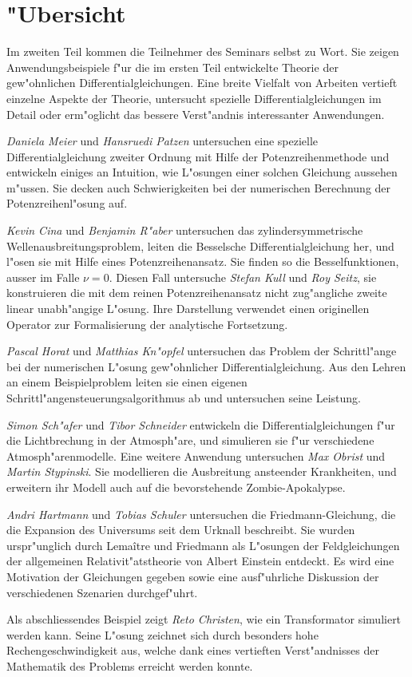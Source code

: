 %
%
%
\chapter*{"Ubersicht}
\rhead{}
\label{skript:uebersicht}
Im zweiten Teil kommen die Teilnehmer des Seminars selbst zu Wort.
Sie zeigen Anwendungsbeispiele f"ur die im ersten
Teil entwickelte Theorie der gew"ohnlichen Differentialgleichungen.
Eine breite Vielfalt von Arbeiten vertieft einzelne Aspekte der Theorie,
untersucht spezielle Differentialgleichungen im Detail
oder erm"oglicht das bessere Verst"andnis interessanter Anwendungen.

{\em Daniela Meier} und {\em Hansruedi Patzen} untersuchen eine spezielle
Differentialgleichung zweiter Ordnung mit Hilfe der Potenzreihenmethode
und entwickeln einiges an Intuition, wie L"osungen einer solchen Gleichung
aussehen m"ussen.
Sie decken auch Schwierigkeiten bei der numerischen Berechnung der
Potenzreihenl"osung auf.

{\em Kevin Cina} und {\em Benjamin R"aber} untersuchen das zylindersymmetrische
Wellenausbreitungsproblem, leiten die Besselsche Differentialgleichung
her, und l"osen sie mit Hilfe eines Potenzreihenansatz.
Sie finden so die Besselfunktionen, ausser im Falle $\nu =0$.
Diesen Fall untersuche {\em Stefan Kull} und {\em Roy Seitz}, sie konstruieren
die mit dem reinen Potenzreihenansatz nicht zug"angliche zweite linear
unabh"angige L"osung.
Ihre Darstellung verwendet einen originellen Operator zur Formalisierung
der analytische Fortsetzung.

{\em Pascal Horat} und {\em Matthias Kn"opfel} untersuchen das Problem
der Schrittl"ange bei der numerischen L"osung gew"ohnlicher
Differentialgleichung.
Aus den Lehren an einem Beispielproblem leiten sie einen eigenen
Schrittl"angensteuerungsalgorithmus ab und untersuchen seine Leistung.

{\em Simon Sch"afer} und {\em Tibor Schneider} entwickeln die
Differentialgleichungen f"ur die Lichtbrechung in der Atmosph"are, und
simulieren sie f"ur verschiedene Atmosph"arenmodelle.
Eine weitere Anwendung untersuchen {\em Max Obrist} und {\em Martin Stypinski}.
Sie modellieren die Ausbreitung ansteender Krankheiten, und erweitern
ihr Modell auch auf die bevorstehende Zombie-Apokalypse.

{\em Andri Hartmann} und {\em Tobias Schuler} untersuchen die 
Friedmann-Gleichung, die die Expansion des Universums seit dem
Urknall beschreibt.
Sie wurden urspr"unglich
durch Lema\^{i}tre und Friedmann
als L"osungen der Feldgleichungen
der allgemeinen Relativit"atstheorie von Albert Einstein
entdeckt.
Es wird eine Motivation der Gleichungen gegeben sowie eine
ausf"uhrliche Diskussion der verschiedenen Szenarien durchgef"uhrt.

Als abschliessendes Beispiel zeigt {\em Reto Christen}, wie ein Transformator
simuliert werden kann. 
Seine L"osung zeichnet sich durch besonders hohe Rechengeschwindigkeit aus,
welche dank eines vertieften Verst"andnisses der Mathematik des Problems
erreicht werden konnte.











